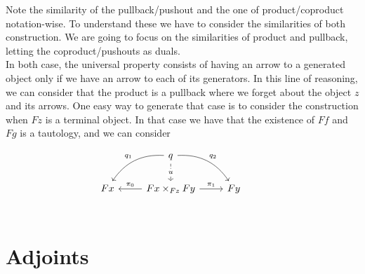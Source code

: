 Note the  similarity of the pullback/pushout and the one of product/coproduct notation-wise. To understand these we have to consider the similarities of both construction. We are going to focus on the similarities of product and pullback, letting the coproduct/pushouts as duals.\\

In both case, the universal property consists of having an arrow to a generated object only if we have an arrow to each of its generators. In this line of reasoning, we can consider that the product is a pullback where we forget about the object $z$ and its arrows. One easy way to generate that case is to consider the construction when $Fz$ is a terminal object. In that case we have that the existence of $Ff$ and $Fg$ is a tautology, and we can consider 

\[
  \begin{tikzcd}
    & q
    \arrow[bend left]{dr}{q_2}
    \arrow[bend right,swap]{dl}{q_1}
    \arrow[dashed]{d}[description]{u} & & \\
    Fx  & Fx\times_{Fz}Fy \arrow{r}{\pi_1} \arrow{l}[swap]{\pi_0}& Fy \\
  \end{tikzcd}
\]








\section{Adjoints}

